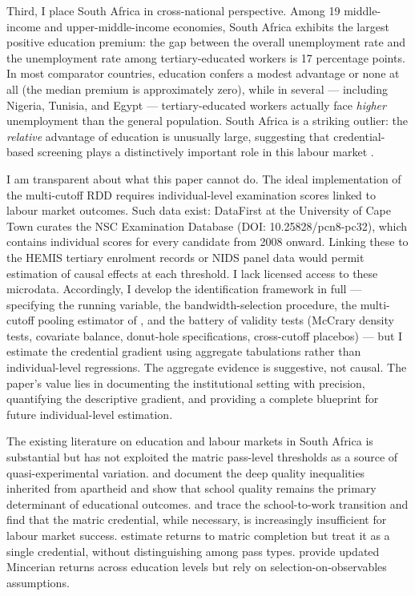 \documentclass[12pt]{article}
\begin{document}
Third, I place South Africa in cross-national perspective. Among 19 middle-income and upper-middle-income economies, South Africa exhibits the largest positive education premium: the gap between the overall unemployment rate and the unemployment rate among tertiary-educated workers is 17 percentage points. In most comparator countries, education confers a modest advantage or none at all (the median premium is approximately zero), while in several --- including Nigeria, Tunisia, and Egypt --- tertiary-educated workers actually face \emph{higher} unemployment than the general population. South Africa is a striking outlier: the \emph{relative} advantage of education is unusually large, suggesting that credential-based screening plays a distinctively important role in this labour market \citep{psacharopoulos2018returns}.

I am transparent about what this paper cannot do. The ideal implementation of the multi-cutoff RDD requires individual-level examination scores linked to labour market outcomes. Such data exist: DataFirst at the University of Cape Town curates the NSC Examination Database (DOI: 10.25828/pcn8-pc32), which contains individual scores for every candidate from 2008 onward. Linking these to the HEMIS tertiary enrolment records or NIDS panel data would permit estimation of causal effects at each threshold. I lack licensed access to these microdata. Accordingly, I develop the identification framework in full --- specifying the running variable, the bandwidth-selection procedure, the multi-cutoff pooling estimator of \citet{cattaneo2020multi}, and the battery of validity tests (McCrary density tests, covariate balance, donut-hole specifications, cross-cutoff placebos) --- but I estimate the credential gradient using aggregate tabulations rather than individual-level regressions. The aggregate evidence is suggestive, not causal. The paper's value lies in documenting the institutional setting with precision, quantifying the descriptive gradient, and providing a complete blueprint for future individual-level estimation.

The existing literature on education and labour markets in South Africa is substantial but has not exploited the matric pass-level thresholds as a source of quasi-experimental variation. \citet{vanderberg2007apartheid} and \citet{spaull2015schooling} document the deep quality inequalities inherited from apartheid and show that school quality remains the primary determinant of educational outcomes. \citet{lam2011education} and \citet{branson2019youth} trace the school-to-work transition and find that the matric credential, while necessary, is increasingly insufficient for labour market success. \citet{ranchhod2021matric} estimate returns to matric completion but treat it as a single credential, without distinguishing among pass types. \citet{kerr2019examining} provide updated Mincerian returns across education levels but rely on selection-on-observables assumptions.
\end{document}
